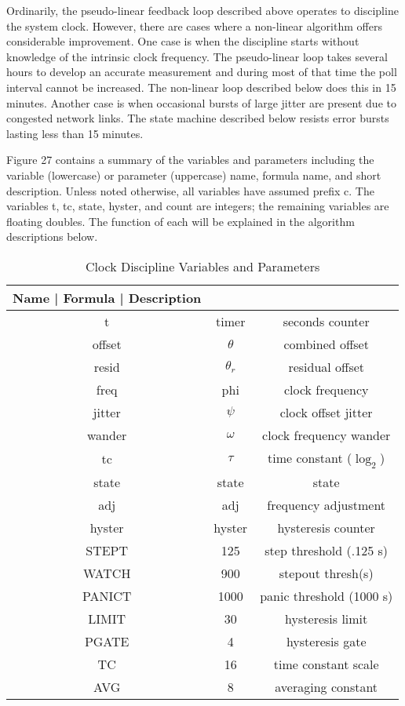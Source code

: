 Ordinarily, the pseudo-linear feedback loop described above operates
to discipline the system clock.  However, there are cases where a
non-linear algorithm offers considerable improvement.  One case is
when the discipline starts without knowledge of the intrinsic clock
frequency.  The pseudo-linear loop takes several hours to develop an
accurate measurement and during most of that time the poll interval
cannot be increased.  The non-linear loop described below does this
in 15 minutes.  Another case is when occasional bursts of large
jitter are present due to congested network links.  The state machine
described below resists error bursts lasting less than 15 minutes.

Figure 27 contains a summary of the variables and parameters
including the variable (lowercase) or parameter (uppercase) name,
formula name, and short description.  Unless noted otherwise, all
variables have assumed prefix c.  The variables t, tc, state, hyster,
and count are integers; the remaining variables are floating doubles.
The function of each will be explained in the algorithm descriptions
below.

\begin{table}[htb]
\center
\begin{tabular}{c | c | c}
Name   | Formula    | Description              \\
\hline
\hline
t      & timer      & seconds counter          \\
offset & $ \theta $      & combined offset          \\
resid  & $ \theta_r $   & residual offset          \\
freq   & phi        & clock frequency          \\
jitter & $ \psi $        & clock offset jitter      \\
wander & $ \omega $      & clock frequency wander   \\
tc     & $ \tau $        & time constant ($ \log_2 $)     \\
state  & state      & state                    \\
adj    & adj        & frequency adjustment     \\
hyster & hyster     & hysteresis counter       \\
STEPT  & 125        & step threshold (.125 s)  \\
WATCH  & 900        & stepout thresh(s)        \\
PANICT & 1000       & panic threshold (1000 s) \\
LIMIT  & 30         & hysteresis limit         \\
PGATE  & 4          & hysteresis gate          \\
TC     & 16         & time constant scale      \\
AVG    & 8          & averaging constant       \\
\hline
\end{tabular}
\label{clock_discipline_variables_and_parameters}
\caption{Clock Discipline Variables and Parameters}
\end{table}

